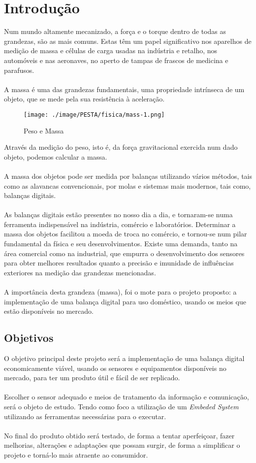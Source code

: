 \chapter{Introdução}
Num mundo altamente mecanizado, a força e o torque dentro de todas as grandezas, são as mais comuns. Estas têm um papel significativo nos aparelhos de medição de massa e células de carga usadas na indústria e retalho, nos automóveis e nas aeronaves, no aperto de tampas de frascos de medicina e parafusos.\cite{book-9}
\\
\\
A massa é uma das grandezas fundamentais, uma propriedade intrínseca de um objeto, que se mede pela sua resistência à aceleração.\cite{book-2}
\begin{figure}[H]
	\centering
	\texttt{[image: ./image/PESTA/fisica/mass-1.png]}
	\caption{Peso e Massa}
	\label{mass}
\end{figure}
Através da medição do peso, isto é, da força gravitacional exercida num dado objeto, podemos calcular a massa. \cite{book-2}
\\
\\
A massa dos objetos pode ser medida por balanças utilizando vários métodos, tais como as alavancas convencionais, por  molas e sistemas mais modernos, tais como, balanças digitais.
\\
\\
As balanças digitais estão presentes no nosso dia a dia, e tornaram-se numa ferramenta indispensável na indústria, comércio e laboratórios. Determinar a massa dos objetos facilitou a moeda de troca no comércio, e tornou-se num pilar fundamental da física e seu desenvolvimentos. Existe uma demanda, tanto na área comercial como na industrial, que empurra o desenvolvimento dos sensores para obter melhores resultados quanto a precisão e imunidade de influências exteriores na medição das grandezas mencionadas.
\\
\\
A importância desta grandeza (massa), foi o mote para o projeto proposto: a implementação de uma balança digital para uso doméstico, usando os meios que estão disponíveis no mercado.
\section{Objetivos}
O objetivo principal deste projeto será a implementação de uma balança digital economicamente viável, usando os sensores e equipamentos disponíveis no mercado, para ter um produto útil e fácil de ser replicado.
\\
\\
Escolher o sensor adequado e meios de tratamento da informação e comunicação, será o objeto de estudo. Tendo como foco a utilização de um \textit{Embeded System} utilizando as ferramentas necessárias para o executar.
\\
\\
No final do produto obtido será testado, de forma a tentar aperfeiçoar, fazer melhorias, alterações e adaptações que possam surgir, de forma a simplificar o projeto e torná-lo mais atraente ao consumidor.
